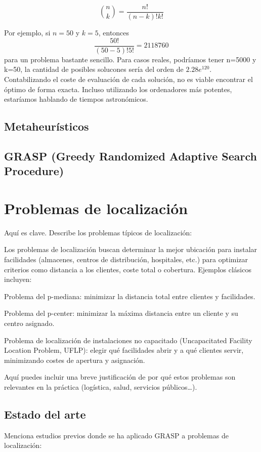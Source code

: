 \documentclass[12pt,a4paper]{book}
\begin{document}
$$
    \binom{n}{k} = \frac{n!}{(n-k)!k!}
$$

Por ejemplo, si $n=50$ y $k=5$, entonces
$$
    \frac{50!}{(50-5)!5!}=2118760
$$
para un problema bastante sencillo. Para casos reales, podríamos tener n=5000 y k=50, la cantidad de posibles solucones sería del orden de $2.28  e^{120}$. Contabilizando el coste de 
evaluación de cada solución, no es viable encontrar el óptimo de forma exacta. Incluso utilizando los ordenadores más potentes, estaríamos hablando de tiempos astronómicos.

\subsection{Metaheurísticos}


\subsection{GRASP (Greedy Randomized Adaptive Search Procedure)}

\section{Problemas de localización}
Aquí es clave. Describe los problemas típicos de localización:

Los problemas de localización buscan determinar la mejor ubicación para instalar facilidades (almacenes, centros de distribución, hospitales, etc.) para optimizar criterios como distancia a los clientes, coste total o cobertura. Ejemplos clásicos incluyen:

Problema del p-mediana: minimizar la distancia total entre clientes y facilidades.

Problema del p-center: minimizar la máxima distancia entre un cliente y su centro asignado.

Problema de localización de instalaciones no capacitado (Uncapacitated Facility Location Problem, UFLP): elegir qué facilidades abrir y a qué clientes servir, minimizando costes de apertura y asignación.

Aquí puedes incluir una breve justificación de por qué estos problemas son relevantes en la práctica (logística, salud, servicios públicos…).

\subsection{Estado del arte}

Menciona estudios previos donde se ha aplicado GRASP a problemas de localización:
\end{document}
